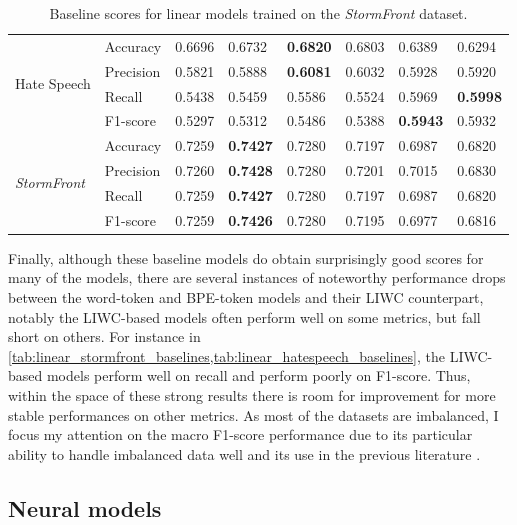 \begin{table}
{\begin{tabular}{ll|ll|ll|ll}
    \multirow{4}{*}{Hate Speech}          & Accuracy  & 0.6696      & 0.6732        & \bf{0.6820} & 0.6803      & 0.6389      & 0.6294      \\
                                          & Precision & 0.5821      & 0.5888        & \bf{0.6081} & 0.6032      & 0.5928      & 0.5920      \\
                                          & Recall    & 0.5438      & 0.5459        & 0.5586      & 0.5524      & 0.5969      & \bf{0.5998} \\
                                          & F1-score  & 0.5297      & 0.5312        & 0.5486      & 0.5388      & \bf{0.5943} & 0.5932      \\\hline
    \multirow{4}{*}{\textit{StormFront}}  & Accuracy  & 0.7259      & \bf{0.7427}   & 0.7280      & 0.7197      & 0.6987      & 0.6820      \\
                                          & Precision & 0.7260      & \bf{0.7428}   & 0.7280      & 0.7201      & 0.7015      & 0.6830      \\
                                          & Recall    & 0.7259      & \bf{0.7427}   & 0.7280      & 0.7197      & 0.6987      & 0.6820      \\
                                          & F1-score  & 0.7259      & \bf{0.7426}   & 0.7280      & 0.7195      & 0.6977      & 0.6816
    \end{tabular}%
    }
    \caption{Baseline scores for linear models trained on the \textit{StormFront} dataset.}
    \label{tab:linear_stormfront_baselines}
\end{table}

Finally, although these baseline models do obtain surprisingly good scores for many of the models, there are several instances of noteworthy performance drops between the word-token and BPE-token models and their LIWC counterpart, notably the LIWC-based models often perform well on some metrics, but fall short on others. For instance in \cref{tab:linear_stormfront_baselines,tab:linear_hatespeech_baselines}, the LIWC-based models perform well on recall and perform poorly on F1-score. Thus, within the space of these strong results there is room for improvement for more stable performances on other metrics.
As most of the datasets are imbalanced, I focus my attention on the macro F1-score performance due to its particular ability to handle imbalanced data well and its use in the previous literature \citep{Macro F1 papers}.

\subsection{Neural models}


